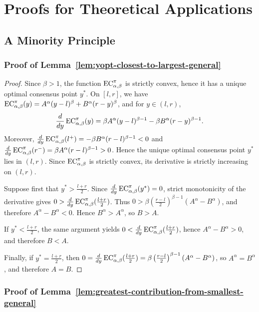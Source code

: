 \section{Proofs for Theoretical Applications}
\label{appendix:theoretical-applications-proofs}

\subsection{A Minority Principle}

\subsubsection{Proof of Lemma~\ref{lem:yopt-closest-to-largest-general}}
\label{appendix:proof-yopt-closest-to-largest-general}

\yoptClosest*
\begin{proof}
Since \(\beta>1\), the function \(\EC[\alpha,\beta][\pi]\) is strictly convex, hence it has a unique optimal consensus point \(y^*\). On \([l,r]\), we have \(\EC[\alpha,\beta][\pi](y)=A^\alpha (y-l)^\beta + B^\alpha (r-y)^\beta\), and for \(y\in(l,r)\),
\[
\frac{d}{dy}\EC[\alpha,\beta][\pi](y)
=
\beta A^\alpha (y-l)^{\beta-1}
-
\beta B^\alpha (r-y)^{\beta-1}.
\]
Moreover, \(\frac{d}{dy}\EC[\alpha,\beta][\pi](l^+)=-\beta B^\alpha (r-l)^{\beta-1}<0\) and \(\frac{d}{dy}\EC[\alpha,\beta][\pi](r^-)=\beta A^\alpha (r-l)^{\beta-1}>0\). Hence the unique optimal consensus point \(y^*\) lies in \((l,r)\). Since \(\EC[\alpha,\beta][\pi]\) is strictly convex, its derivative is strictly increasing on \((l,r)\).

Suppose first that \(y^*>\frac{l+r}{2}\). Since \(\frac{d}{dy}\EC[\alpha,\beta][\pi](y^*)=0\), strict monotonicity of the derivative gives \(0>\frac{d}{dy}\EC[\alpha,\beta][\pi](\frac{l+r}{2})\). Thus \(0>\beta\left(\frac{r-l}{2}\right)^{\beta-1}(A^\alpha-B^\alpha)\), and therefore \(A^\alpha-B^\alpha<0\). Hence \(B^\alpha>A^\alpha\), so \(B>A\).

If \(y^*<\frac{l+r}{2}\), the same argument yields \(0<\frac{d}{dy}\EC[\alpha,\beta][\pi](\frac{l+r}{2})\), hence \(A^\alpha-B^\alpha>0\), and therefore \(B<A\).

Finally, if \(y^*=\frac{l+r}{2}\), then \(0=\frac{d}{dy}\EC[\alpha,\beta][\pi](\frac{l+r}{2})=\beta\left(\frac{r-l}{2}\right)^{\beta-1}(A^\alpha-B^\alpha)\), so \(A^\alpha=B^\alpha\), and therefore \(A=B\).
\end{proof}

\subsubsection{Proof of Lemma~\ref{lem:greatest-contribution-from-smallest-general}}
\label{appendix:proof-greatest-contribution-from-smallest-general}

